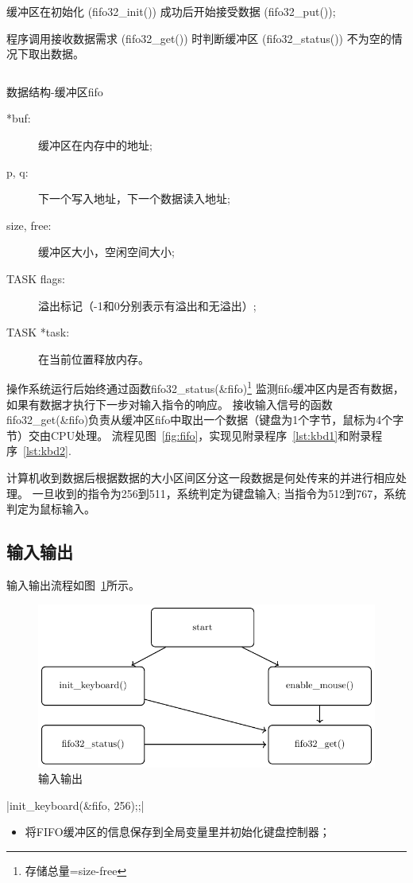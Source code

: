 缓冲区在初始化 (fifo32\_init()) 成功后开始接受数据 (fifo32\_put());

程序调用接收数据需求 (fifo32\_get()) 时判断缓冲区 (fifo32\_status()) 不为空的情况下取出数据。
\begin{listing}[H]
  \inputminted[tabsize=2, firstline=40, lastline=44,
    linenos=true]{c}{../ZOS/src/kernel/bootpack.h}
  \caption{数据结构-缓冲区fifo}
  \label{lst:fifo}
\end{listing}
\begin{description}
\item[*buf:]缓冲区在内存中的地址;
\item[p, q:]下一个写入地址，下一个数据读入地址;
\item[size, free:]缓冲区大小，空闲空间大小;
\item[TASK flags:]溢出标记（-1和0分别表示有溢出和无溢出）;
\item[TASK *task:]在当前位置释放内存。
\end{description}

操作系统运行后始终通过函数fifo32\_status(\&fifo)\footnote{存储总量=size-free}
监测fifo缓冲区内是否有数据，如果有数据才执行下一步对输入指令的响应。
接收输入信号的函数fifo32\_get(\&fifo)负责从缓冲区fifo中取出一个数据（键盘为1个字节，鼠标为4个字节）交由CPU处理。
流程见图~\ref{fig:fifo}，实现见附录程序~\ref{lst:kbd1}和附录程序~\ref{lst:kbd2}.

计算机收到数据后根据数据的大小区间区分这一段数据是何处传来的并进行相应处理。
一旦收到的指令为256到511，系统判定为键盘输入;
当指令为512到767，系统判定为鼠标输入。

\newpage
\subsection{输入输出}

输入输出流程如图~\ref{fig:io}所示。
\begin{figure}[H]
  \centering
  \includegraphics[width=.5\textwidth]{../Fig/func/io.pdf}
  \caption{输入输出}
  \label{fig:io}
\end{figure}

\csingle|init_keyboard(&fifo, 256);;|
\begin{itemize}
  \item 将FIFO缓冲区的信息保存到全局变量里并初始化键盘控制器；
\end{itemize}

